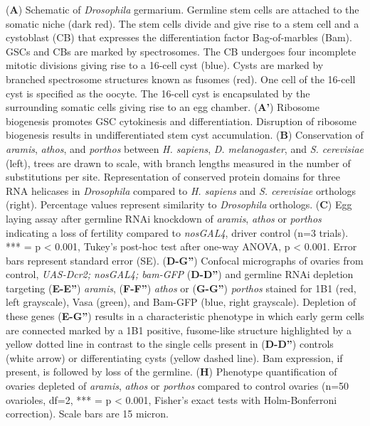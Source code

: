 \documentclass[12pt,oneside]{reedthesis}
\begin{document}
\setlength\parindent{0pt}(\textbf{A}) Schematic of \emph{Drosophila} germarium. Germline stem cells are attached to the somatic niche (dark red). The stem cells divide and give rise to a stem cell and a cystoblast (CB) that expresses the differentiation factor Bag-of-marbles (Bam). GSCs and CBs are marked by spectrosomes. The CB undergoes four incomplete mitotic divisions giving rise to a 16-cell cyst (blue). Cysts are marked by branched spectrosome structures known as fusomes (red). One cell of the 16-cell cyst is specified as the oocyte. The 16-cell cyst is encapsulated by the surrounding somatic cells giving rise to an egg chamber. (\textbf{A'}) Ribosome biogenesis promotes GSC cytokinesis and differentiation. Disruption of ribosome biogenesis results in undifferentiated stem cyst accumulation. (\textbf{B}) Conservation of \emph{aramis}, \emph{athos}, and \emph{porthos} between \emph{H. sapiens}, \emph{D. melanogaster}, and \emph{S. cerevisiae} (left), trees are drawn to scale, with branch lengths measured in the number of substitutions per site. Representation of conserved protein domains for three RNA helicases in \emph{Drosophila} compared to \emph{H. sapiens} and \emph{S. cerevisiae} orthologs (right). Percentage values represent similarity to \emph{Drosophila} orthologs. (\textbf{C}) Egg laying assay after germline RNAi knockdown of \emph{aramis}, \emph{athos} or \emph{porthos} indicating a loss of fertility compared to \emph{nosGAL4}, driver control (n=3 trials). *** = p \textless{} 0.001, Tukey's post-hoc test after one-way ANOVA, p \textless{} 0.001. Error bars represent standard error (SE). (\textbf{D-G''}) Confocal micrographs of ovaries from control, \emph{UAS-Dcr2; nosGAL4; bam-GFP} (\textbf{D-D''}) and germline RNAi depletion targeting (\textbf{E-E''}) \emph{aramis}, (\textbf{F-F''}) \emph{athos} or (\textbf{G-G''}) \emph{porthos} stained for 1B1 (red, left grayscale), Vasa (green), and Bam-GFP (blue, right grayscale). Depletion of these genes (\textbf{E-G''}) results in a characteristic phenotype in which early germ cells are connected marked by a 1B1 positive, fusome-like structure highlighted by a yellow dotted line in contrast to the single cells present in (\textbf{D-D''}) controls (white arrow) or differentiating cysts (yellow dashed line). Bam expression, if present, is followed by loss of the germline. (\textbf{H}) Phenotype quantification of ovaries depleted of \emph{aramis}, \emph{athos} or \emph{porthos} compared to control ovaries (n=50 ovarioles, df=2, *** = p \textless{} 0.001, Fisher's exact tests with Holm-Bonferroni correction). Scale bars are 15 micron.
\end{document}

